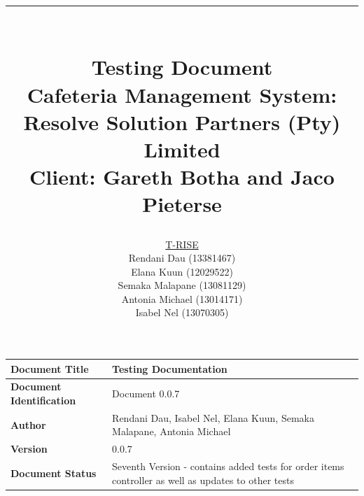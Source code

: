 \documentclass[a4paper,12pt]{report}
\title{ \rule{\textwidth}{1pt}  \\ \Huge Testing Document \\ 
	\Large Cafeteria Management System: Resolve Solution Partners (Pty) Limited \\
	\small Client: Gareth Botha and Jaco Pieterse}
\author{
         \underline{T-RISE}\\
          Rendani Dau (13381467) \\
	Elana Kuun (12029522) \\
	Semaka Malapane (13081129) \\
	Antonia Michael (13014171) \\
	Isabel Nel (13070305)}
\date{\today \\ \rule{\textwidth}{1pt}}
\begin{document}
\maketitle
\break

\tableofcontents
\break


 \begin{tabu} to 0.8\textwidth { | X[l] | X[l] | }
 \hline
 \textbf{Document Title} & Testing Documentation \\
 \hline
 \textbf{Document Identification}  & Document 0.0.7 \\
 \hline
 \textbf{Author}  & Rendani Dau, Isabel Nel, Elana Kuun, Semaka Malapane, Antonia Michael \\
 \hline
 \textbf{Version} & 0.0.7\\
 \hline
 \textbf{Document Status} & Seventh Version - contains added tests for order items controller as well as updates to other tests  \\
 \hline
 \end{tabu}
\end{document}
